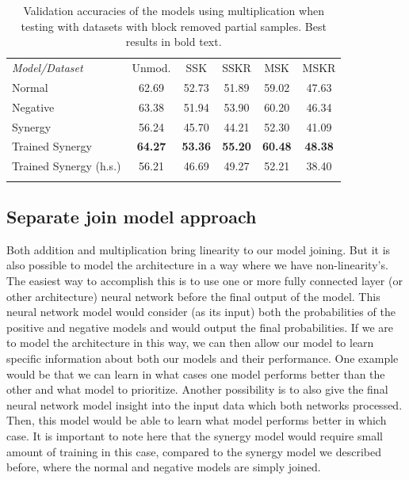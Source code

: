 \documentclass[b5paper]{book}
\begin{document}
\begin{table}
\centering
\caption{Validation accuracies of the models using multiplication when testing with datasets with block removed partial samples. Best results in bold text.}
\label{tab:10}
\tabcolsep=0.06cm
\begin{tabular}{lccccc}
\hline\noalign{\smallskip}
\emph{Model/Dataset} & Unmod. & SSK & SSKR & MSK & MSKR \\
\noalign{\smallskip}\hline\noalign{\smallskip}
Normal & 62.69 & 52.73 & 51.89 & 59.02 & 47.63 \\
Negative & 63.38 & 51.94 & 53.90 & 60.20 & 46.34 \\
Synergy & 56.24 & 45.70 & 44.21 & 52.30 & 41.09 \\
Trained Synergy & \textbf{64.27} & \textbf{53.36} & \textbf{55.20} & \textbf{60.48} & \textbf{48.38} \\
Trained Synergy (h.s.) & 56.21 & 46.69 & 49.27 & 52.21 & 38.40 \\
\noalign{\smallskip}\hline
\end{tabular}
\end{table}

\subsection{Separate join model approach}

Both addition and multiplication bring linearity to our model joining. But it is also possible to model the architecture in a way where we have non-linearity's. The easiest way to accomplish this is to use one or more fully connected layer (or other architecture) neural network before the final output of the model. This neural network model would consider (as its input) both the probabilities of the positive and negative models and would output the final probabilities. If we are to model the architecture in this way, we can then allow our model to learn specific information about both our models and their performance. One example would be that we can learn in what cases one model performs better than the other and what model to prioritize. Another possibility is to also give the final neural network model insight into the input data which both networks processed. Then, this model would be able to learn what model performs better in which case. It is important to note here that the synergy model would require small amount of training in this case, compared to the synergy model we described before, where the normal and negative models are simply joined.
\end{document}
